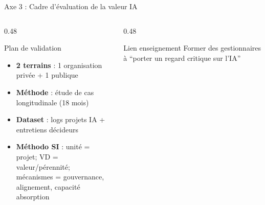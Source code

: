 \documentclass[aspectratio=169,11pt]{beamer}
\begin{document}
\begin{frame}{Axe 3 : Cadre d'évaluation de la valeur IA}
  \begin{columns}[T]
    \begin{column}{0.48\textwidth}
      \begin{block}{Plan de validation}
        \begin{itemize}\scriptsize
          \item \textbf{2 terrains} : 1 organisation privée + 1 publique
          \item \textbf{Méthode} : étude de cas longitudinale (18 mois)
          \item \textbf{Dataset} : logs projets IA + entretiens décideurs
          \item \textbf{Méthodo SI} : unité = projet; VD = valeur/pérennité;\\mécanismes = gouvernance, alignement, capacité absorption
        \end{itemize}
      \end{block}
    \end{column}
    \begin{column}{0.48\textwidth}
      \begin{block}{Lien enseignement}
        \small Former des gestionnaires à ``porter un regard critique sur l'IA''
      \end{block}
    \end{column}
  \end{columns}
\end{frame}
\end{document}
